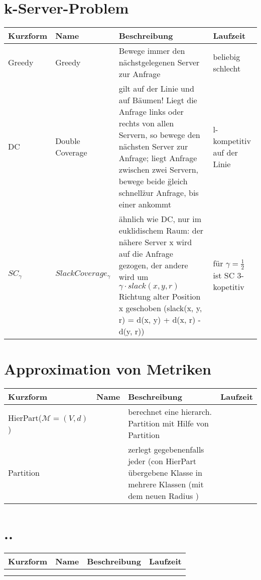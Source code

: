 \section{k-Server-Problem}
\begin{tabularx}{\textwidth}{|l|X|X|X|} \hline
Kurzform & Name & Beschreibung & Laufzeit\\ \hline \hline
Greedy  & Greedy & Bewege immer den nächstgelegenen Server zur Anfrage & beliebig schlecht \\ \hline
DC  & Double Coverage & gilt auf der Linie und auf Bäumen! Liegt die Anfrage links oder rechts von allen Servern, so bewege den nächsten Server zur Anfrage; liegt Anfrage zwischen zwei Servern, bewege beide \"gleich schnell\" zur Anfrage, bis einer ankommt& l-kompetitiv auf der Linie \\ \hline
 $SC_{\gamma}$ & $Slack Coverage_{\gamma}$ & ähnlich wie DC, nur im euklidischem Raum: der nähere Server x wird auf die Anfrage gezogen, der andere wird um $\gamma \cdot slack(x, y, r)$ Richtung alter Position x geschoben (slack(x, y, r) = d(x, y) + d(x, r) - d(y, r)) & für $\gamma = \tfrac{1}{2}$ ist SC 3-kopetitiv \\ \hline
\end{tabularx}


\section{Approximation von Metriken}
\begin{tabularx}{\textwidth}{|l|l|X|l|} \hline
Kurzform & Name & Beschreibung & Laufzeit\\ \hline \hline
 HierPart($\mathcal{M} = (V, d)$) &  & berechnet eine hierarch. Partition mit Hilfe von Partition &  \\ \hline
 Partition &  & zerlegt gegebenenfalls jeder (con HierPart übergebene Klasse in mehrere Klassen (mit dem neuen Radius )&  \\ \hline
\end{tabularx}




\section{..}
\begin{tabularx}{\textwidth}{|l|X|X|X|} \hline
Kurzform & Name & Beschreibung & Laufzeit\\ \hline \hline
  &  &  &  \\ \hline
  &  &  &  \\ \hline
\end{tabularx}
